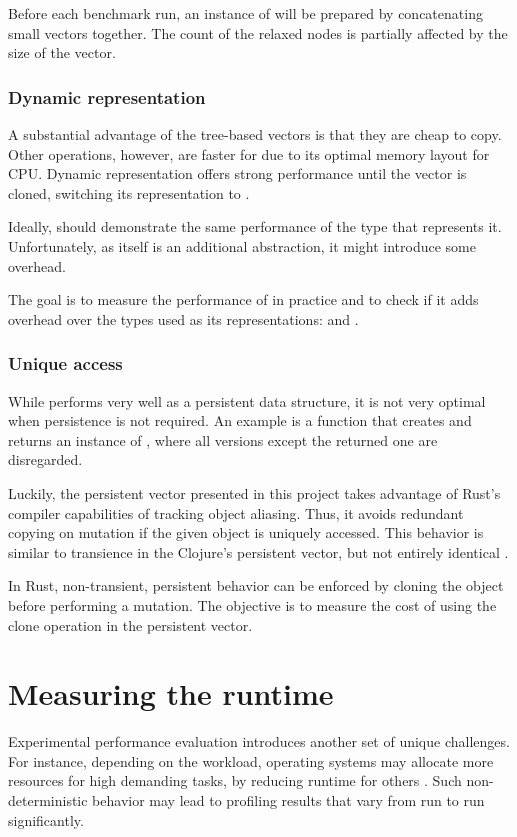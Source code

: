 Before each benchmark run, an instance of \rrbvec{} will be prepared by concatenating small vectors together. The count of the relaxed nodes is partially affected by the size of the vector.

\subsubsection*{Dynamic representation}
A substantial advantage of the tree-based vectors is that they are cheap to copy. Other operations, however, are faster for \stdvec{} due to its optimal memory layout for CPU. Dynamic representation offers strong \stdvec{} performance until the vector is cloned, switching its representation to \rrbvec{}.

Ideally, \pvec{} should demonstrate the same performance of the type that represents it. Unfortunately, as \pvec{} itself is an additional abstraction, it might introduce some overhead.

The goal is to measure the performance of \pvec{} in practice and to check if it adds overhead over the types used as its representations: \stdvec{} and \rrbvec{}.

\subsubsection*{Unique access}
While \rrbvec{} performs very well as a persistent data structure, it is not very optimal when persistence is not required. An example is a function that creates and returns an instance of \rrbvec{}, where all versions except the returned one are disregarded.

Luckily, the persistent vector presented in this project takes advantage of Rust's compiler capabilities of tracking object aliasing. Thus, it avoids redundant copying on mutation if the given object is uniquely accessed. This behavior is similar to transience in the Clojure's persistent vector, but not entirely identical \cite{improving-performance-through-transience}.

In Rust, non-transient, persistent behavior can be enforced by cloning the object before performing a mutation. The objective is to measure the cost of using the clone operation in the persistent vector.

\section{Measuring the runtime}
Experimental performance evaluation introduces another set of unique challenges. For instance, depending on the workload, operating systems may allocate more resources for high demanding tasks, by reducing runtime for others \cite{statistically-rigorous-java-performance-evaluation}. Such non-deterministic behavior may lead to profiling results that vary from run to run significantly.

